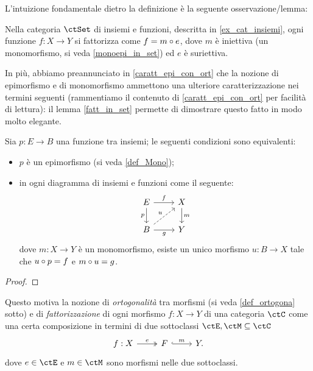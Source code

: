 \medskip
L'intuizione fondamentale dietro la definizione è la seguente osservazione/lemma:
\begin{lemma}\label{fatt_in_set}
	Nella categoria \(\ctSet\) di insiemi e funzioni, descritta in \ref{ex_cat_insiemi}, ogni funzione \(f : X \to Y\) si fattorizza come \(f = m \circ e\), dove \(m\) è iniettiva (un monomorfismo, si veda \ref{monoepi_in_set}) ed \(e\) è suriettiva.%
\end{lemma}
In più, abbiamo preannunciato in \ref{caratt_epi_con_ort} che la nozione di epimorfismo e di monomorfismo ammettono una ulteriore caratterizzazione nei termini seguenti (rammentiamo il contenuto di \ref{caratt_epi_con_ort} per facilità di lettura): il lemma \ref{fatt_in_set} permette di dimostrare questo fatto in modo molto elegante.
\begin{proposition*}
	Sia \(p : E \to B\) una funzione tra insiemi; le seguenti condizioni sono equivalenti:
	\begin{itemize}
		\item \(p\) è un epimorfismo (si veda \ref{def_Mono});
		\item in ogni diagramma di insiemi e funzioni come il seguente:
		      \[\begin{tikzcd}
				      E \ar[r, "f"]\ar[d, "p"']& X \ar[d, "m"]\\
				      B \ar[r, "g"'] \ar[ur, dashed, "u"]& Y
			      \end{tikzcd}\]
		      dove \(m : X\to Y\) è un monomorfismo, esiste un unico morfismo \(u : B\to X\) tale che \(u\circ p = f\) e \(m\circ u = g\).
	\end{itemize}
\end{proposition*}
\begin{proof}
\end{proof}
Questo motiva la nozione di \emph{ortogonalità} tra morfismi (si veda \ref{def_ortogona} sotto) e di \emph{fattorizzazione} di ogni morfismo \(f : X\to Y\) di una categoria \(\ctC\) come una certa composizione in termini di due sottoclassi $\ctE,\ctM\subseteq\ctC$ 
\[
	\begin{tikzcd}
		f : X \ar[r, "e", two heads]& F \ar[r, "m", hook] & Y.
	\end{tikzcd}
\]
dove $e\in\ctE$ e $m\in\ctM$ sono morfismi nelle due sottoclassi.

